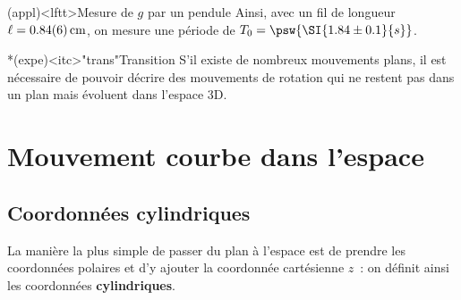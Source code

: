 \documentclass[../../main/main.tex]{subfiles}
\begin{document}
\begin{tcb*}(appl)<lftt>{Mesure de $g$ par un pendule}
	Ainsi, avec un fil de longueur $\ell = \SI{0.84\pm0.06}{cm}$, on mesure une
	période de $T_0 = \psw{\SI{1.84\pm0.1}{s}}$.
	\smallbreak
\end{tcb*}

\begin{tcb}*(expe)<itc>"trans"{Transition}
	S'il existe de nombreux mouvements plans, il est nécessaire de pouvoir
	décrire des mouvements de rotation qui ne restent pas dans un plan mais
	évoluent dans l'espace 3D.
\end{tcb}

\section{Mouvement courbe dans l'espace}
\subsection{Coordonnées cylindriques}

La manière la plus simple de passer du plan à l'espace est de prendre les
coordonnées polaires et d'y ajouter la coordonnée cartésienne $z$~: on définit
ainsi les coordonnées \textbf{cylindriques}.
\end{document}
